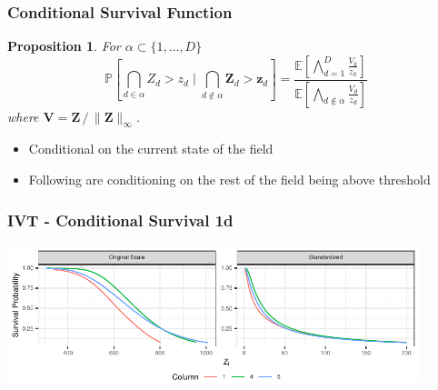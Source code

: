 \documentclass[aspectratio=169,10pt,notes]{beamer}
\newtheorem{prop}{Proposition}
\newlength{\frametextheight}
\begin{document}
\begin{frame}
  \frametitle{Conditional Survival Function}
  \begin{prop}
      For $\alpha \subset \lbrace 1, \ldots, D\rbrace$
    \[
        \mathbb{P}\left[\bigcap_{d\in\alpha}Z_{d} > z_d\mid \bigcap_{d\not\in\alpha}\bm{Z}_{d} > \bm{z}_{d}\right] =
        \frac{\mathbb{E}\left[\bigwedge_{d = 1}^D \frac{V_k}{z_k}\right]}{
                      \mathbb{E}\left[\bigwedge_{d\not\in\alpha}\frac{V_d}{z_d}\right]}
    \]
      where $\bm{V} = \bm{Z}\,/\,\lVert\bm{Z}\rVert_{\infty}$.
  \end{prop}
  \begin{itemize}
      \item Conditional on the current state of the field
      \item Following are conditioning on the rest of the field being above threshold
  \end{itemize}
\end{frame} %

\begin{frame}
  \frametitle{IVT - Conditional Survival 1d}
  \begin{center}
    \includegraphics[height=0.8\frametextheight,width=0.9\textwidth]{./ch1/images/condsurv_1d}
  \end{center}
\end{frame} %
\end{document}
